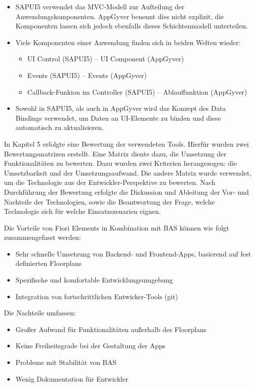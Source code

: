 \begin{itemize}[noitemsep]
\item SAPUI5 verwendet das MVC-Modell zur Aufteilung der Anwendungskomponenten. AppGyver benennt dies nicht explizit, die Komponenten lassen sich jedoch ebenfalls dieses Schichtenmodell unterteilen.
\item Viele Komponenten einer Anwendung finden sich in beiden Welten wieder: 
              \begin{itemize} [noitemsep]
              \item UI Control (SAPUI5) – UI Component (AppGyver) 
              \item Events (SAPUI5) – Events (AppGyver) 
              \item Callback-Funkion im Controller (SAPUI5) – Ablauffunktion (AppGyver)
              \end{itemize} 
\item Sowohl in SAPUI5, als auch in AppGyver wird das Konzept des Data Bindings verwendet, um Daten an UI-Elemente zu binden und diese automatisch zu aktualisieren.
\end{itemize}

In Kapitel 5 erfolgte eine Bewertung der verwendeten Tools. Hierfür wurden zwei Bewertungsmatrizen erstellt. Eine Matrix diente dazu, die Umsetzung der Funktionalitäten zu bewerten. Dazu wurden zwei Kriterien herangezogen: die Umsetzbarkeit und der Umsetzungsaufwand. Die andere Matrix wurde verwendet, um die Technologie aus der Entwickler-Perspektive zu bewerten. Nach Durchführung der Bewertung erfolgte die Diskussion und Ableitung der Vor- und Nachteile der Technologien, sowie die Beantwortung der Frage, welche Technologie sich für welche Einsatzszenarien eignen.

Die Vorteile von Fiori Elements in Kombination mit BAS können wie folgt zusammengefasst werden:

 \begin{itemize} [noitemsep]
 \item Sehr schnelle Umsetzung von Backend- und Frontend-Apps, basierend auf fest definierten Floorplans
 \item Spezifische und komfortable Entwicklungsumgebung 
 \item Integration von fortschrittlichen Entwicker-Tools (git)
 \end{itemize} 

Die Nachteile umfassen:
\begin{itemize}[noitemsep]
\item Großer Aufwand für Funktionalitäten außerhalb des Floorplans
\item Keine Freiheitsgrade bei der Gestaltung der Apps
\item Probleme mit Stabilität von BAS
\item Wenig Dokumentation für Entwickler
\end{itemize}

